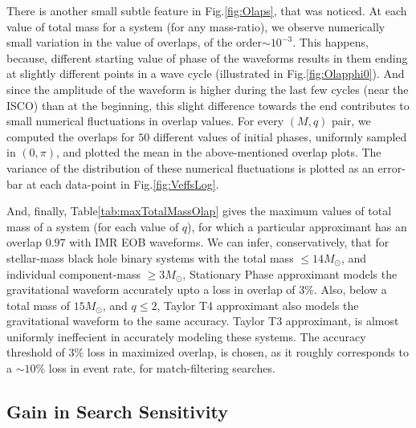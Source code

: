 \documentclass[aps,
prd,
amsmath,
amssymb,
twocolumn,
floatfix,
groupedaddress]{revtex4-1}
\begin{document}
There is another small subtle feature in Fig.\ref{fig:Olaps}, that was noticed. At each value of total mass for a system (for any mass-ratio), we observe numerically small variation in the value of overlaps, of the order$\sim 10^{-3}$. This happens, because, different starting value of phase of the waveforms results in them ending at slightly different points in a wave cycle (illustrated in Fig.\ref{fig:Olapphi0}). And since the amplitude of the waveform is higher during the last few cycles (near the ISCO) than at the beginning, this slight difference towards the end contributes to small numerical fluctuations in overlap values. For every $(M,q)$ pair, we computed the overlaps for $50$ different values of initial phases, uniformly sampled in $(0,\pi)$, and plotted the mean in the above-mentioned overlap plots. The variance of the distribution of these numerical fluctuations is plotted as an error-bar at each data-point in Fig.\ref{fig:VeffsLog}.

And, finally, Table\ref{tab:maxTotalMassOlap} gives the maximum values of total mass of a system (for each value of $q$), for which a particular approximant has an overlap $0.97$ with IMR EOB waveforms. We can infer, conservatively, that for stellar-mass black hole binary systems with the total mass $\leq 14M_{\odot}$, and individual component-mass $\geq 3M_{\odot}$, Stationary Phase approximant models the gravitational waveform accurately upto a loss in overlap of $3\%$. Also, below a total mass of $15M_{\odot}$, and $q\leq 2$, Taylor T4 approximant also models the gravitational waveform to the same accuracy. Taylor T3 approximant, is almost uniformly ineffecient in accurately modeling these systems. The accuracy threshold of $3\%$ loss in maximized overlap, is chosen, as it roughly corresponds to a $\sim10\%$ loss in event rate, for match-filtering searches.

\subsection{Gain in Search Sensitivity}\label{sec:level2:GainSearchSens}
\end{document}

